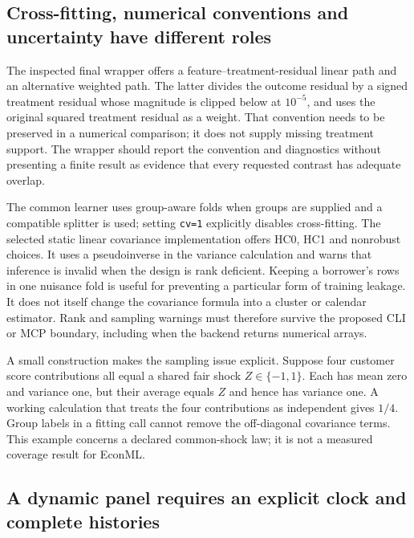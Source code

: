 \subsection{Cross-fitting, numerical conventions and uncertainty have different roles}
\label{exec19:econml-inference}

The inspected final wrapper offers a feature--treatment-residual linear path
and an alternative weighted path. The latter divides the outcome residual
by a signed treatment residual whose magnitude is clipped below at $10^{-5}$,
and uses the original squared treatment residual as a weight. That convention
needs to be preserved in a numerical comparison; it does not supply missing
treatment support. The wrapper should report the convention and diagnostics
without presenting a finite result as evidence that every requested contrast
has adequate overlap.\citep{exec19_econml_source}

The common learner uses group-aware folds when groups are supplied and a
compatible splitter is used; setting \texttt{cv=1} explicitly disables
cross-fitting. The selected static linear covariance implementation offers
HC0, HC1 and nonrobust choices. It uses a pseudoinverse in the variance
calculation and warns that inference is invalid when the design is rank
deficient. Keeping a borrower's rows in one nuisance fold is useful for
preventing a particular form of training leakage. It does not itself change
the covariance formula into a cluster or calendar estimator. Rank and
sampling warnings must therefore survive the proposed CLI or MCP boundary,
including when the backend returns numerical arrays.
\citep{exec19_econml_source}

A small construction makes the sampling issue explicit. Suppose four customer
score contributions all equal a shared fair shock $Z\in\{-1,1\}$. Each
has mean zero and variance one, but their average equals $Z$ and hence has
variance one. A working calculation that treats the four contributions as
independent gives $1/4$. Group labels in a fitting call cannot remove the
off-diagonal covariance terms. This example concerns a declared common-shock
law; it is not a measured coverage result for EconML.
\citep{exec19_econml_reference}

\subsection{A dynamic panel requires an explicit clock and complete histories}
\label{exec19:econml-panel}

